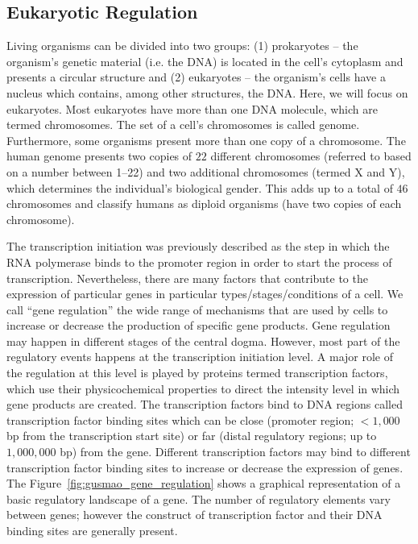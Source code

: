 \subsection{Eukaryotic Regulation}
\label{sec:eukaryotic.regulation}

Living organisms can be divided into two groups: (1) prokaryotes -- the organism's genetic material (i.e. the DNA) is located in the cell's cytoplasm and presents a circular structure and (2) eukaryotes -- the organism's cells have a nucleus which contains, among other structures, the DNA. Here, we will focus on eukaryotes. Most eukaryotes have more than one DNA molecule, which are termed chromosomes. The set of a cell's chromosomes is called genome. Furthermore, some organisms present more than one copy of a chromosome. The human genome presents two copies of $22$ different chromosomes (referred to based on a number between 1--22) and two additional chromosomes (termed X and Y), which determines the individual's biological gender. This adds up to a total of $46$ chromosomes and classify humans as diploid organisms (have two copies of each chromosome).

The transcription initiation was previously described as the step in which the RNA polymerase binds to the promoter region in order to start the process of transcription. Nevertheless, there are many factors that contribute to the expression of particular genes in particular types/stages/conditions of a cell. We call ``gene regulation'' the wide range of mechanisms that are used by cells to increase or decrease the production of specific gene products. Gene regulation may happen in different stages of the central dogma. However, most part of the regulatory events happens at the transcription initiation level. A major role of the regulation at this level is played by proteins termed transcription factors, which use their physicochemical properties to direct the intensity level in which gene products are created. The transcription factors bind to DNA regions called transcription factor binding sites which can be close (promoter region; $< $\approxy$1,000$ bp from the transcription start site) or far (distal regulatory regions; up to \approxy$1,000,000$ bp) from the gene. Different transcription factors may bind to different transcription factor binding sites to increase or decrease the expression of genes. The Figure~\ref{fig:gusmao_gene_regulation} shows a graphical representation of a basic regulatory landscape of a gene. The number of regulatory elements vary between genes; however the construct of transcription factor and their DNA binding sites are generally present.

